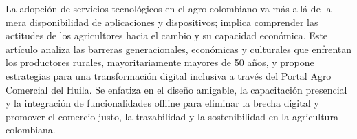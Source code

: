 La adopción de servicios tecnológicos en el agro colombiano va más allá de la mera disponibilidad de aplicaciones y dispositivos; implica comprender las actitudes de los agricultores hacia el cambio y su capacidad económica. Este artículo analiza las barreras generacionales, económicas y culturales que enfrentan los productores rurales, mayoritariamente mayores de 50 años, y propone estrategias para una transformación digital inclusiva a través del Portal Agro Comercial del Huila. Se enfatiza en el diseño amigable, la capacitación presencial y la integración de funcionalidades offline para eliminar la brecha digital y promover el comercio justo, la trazabilidad y la sostenibilidad en la agricultura colombiana.